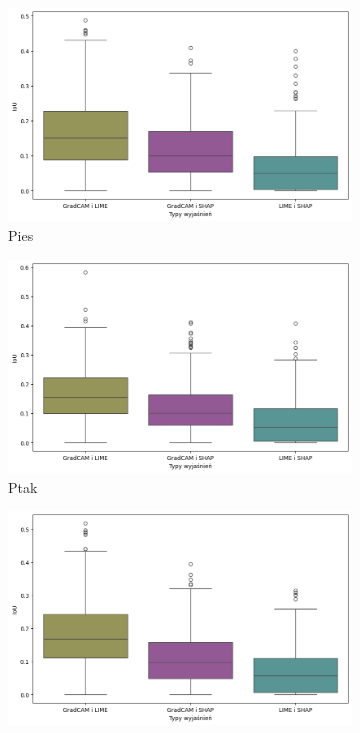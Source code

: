 \begin{figure}[!h]
	\centering
	\begin{subfigure}[b]{0.3\textwidth}
		\centering\includegraphics[width=.9\textwidth]{img/base_coherence_dog}
		\caption{Pies}  \label{}
	\end{subfigure}
	\begin{subfigure}[b]{0.3\textwidth}
		\centering\includegraphics[width=.9\textwidth]{img/base_coherence_bird}
		\caption{Ptak}  \label{}
	\end{subfigure}
	\begin{subfigure}[b]{0.3\textwidth}
		\centering\includegraphics[width=.9\textwidth]{img/base_coherence_vehicle}

\end{subfigure}
\end{figure}
